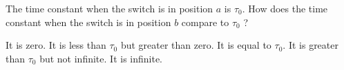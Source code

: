 \begin{questions}\setcounter{question}{12}\question
The time constant when the switch is in position $a$ is $\tau_{0}$. How does the time constant when the switch is in position $b$ compare to $\tau_{0}$ ?

\begin{choices}
\choice It is zero.
\choice It is less than $\tau_{0}$ but greater than zero.
\choice It is equal to $\tau_{0}$.
\choice It is greater than $\tau_{0}$ but not infinite.
\choice It is infinite.
\end{choices}\end{questions}

